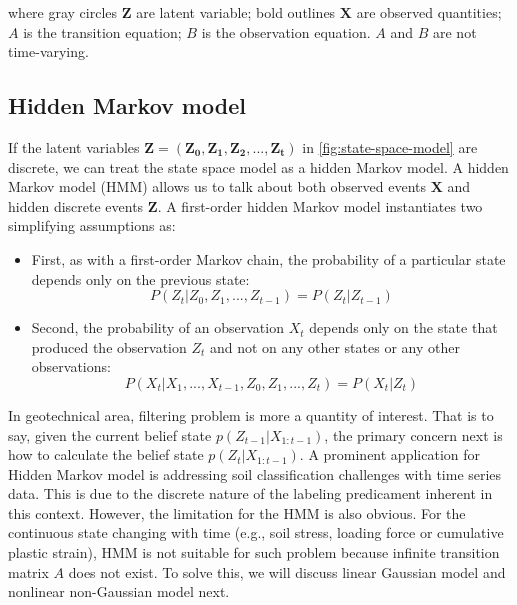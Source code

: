 where gray circles $\boldsymbol{Z}$ are latent variable; bold outlines $\boldsymbol{X}$ are observed quantities; $A$ is the transition equation; $B$ is the observation equation. $A$ and $B$ are not time-varying.

\subsection{Hidden Markov model}

If the latent variables $\boldsymbol{Z} = (\boldsymbol{Z_0},\boldsymbol{Z_1},\boldsymbol{Z_2},...,\boldsymbol{Z_t})$ in \cref{fig:state-space-model} are discrete, we can treat the state space model as a hidden Markov model.  A hidden Markov model (HMM) allows us to talk about both observed events  $\boldsymbol{X}$ and hidden discrete events  $\boldsymbol{Z}$. A first-order hidden Markov model instantiates two simplifying assumptions as:

  \begin{itemize}

  \setlength{\itemsep}{0cm}
  
      \item  First, as with a first-order Markov chain, the probability of a particular state depends
 only on the previous state:
         \setlength\abovedisplayskip{0pt}
        \setlength\belowdisplayskip{0pt}
         \begin{equation}
         P(Z_t|Z_0,Z_1,...,Z_{t-1})= P(Z_t|Z_{t-1})             
         \end{equation}
      
      \item Second, the probability of an  observation $X_t$ depends only on the state that
 produced the observation $Z_t$ and not on any other states or any other observations:
         \begin{equation}
         P(X_t|X_1,...,X_{t-1},Z_0,Z_1,...,Z_{t})= P(X_t|Z_{t})             
         \end{equation}
  \end{itemize}
In geotechnical area, filtering problem is more a quantity of interest. That is to say, given the current belief state $p(Z_{t-1}|X_{1:t-1})$, the primary concern next is how to calculate the belief state $p(Z_t|X_{1:t-1})$.
A prominent application for Hidden Markov model is addressing soil classification challenges with time series data. This is due to the discrete nature of the labeling predicament inherent in this context. However, the limitation for the HMM is also obvious. For the continuous state changing with time (e.g., soil stress, loading force or cumulative plastic strain), HMM is not suitable for such problem because infinite transition matrix $A$ does not exist. To solve this, we will discuss linear Gaussian model and nonlinear non-Gaussian model next. 







